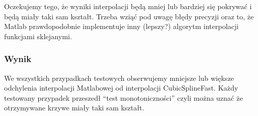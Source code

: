 \documentclass[a4paper,11pt,notitlepage]{article}
\begin{document}
Oczekujemy tego, że wyniki interpolacji będą mniej lub bardziej się pokrywać i będą miały taki sam kształt. Trzeba wziąć pod uwagę błędy precyzji oraz to, że Matlab prawdopodobnie implementuje inny (lepszy?) algorytm interpolacji funkcjami sklejanymi.

\subsubsection{Wynik}

We wszystkich przypadkach testowych obserwujemy mniejsze lub większe odchylenia interpolacji Matlabowej od interpolacji CubicSplineFast. Każdy testowany przypadek przeszedł ``test monotoniczności'' czyli można uznać że otrzymywane krzywe miały taki sam kształt.
\end{document}
